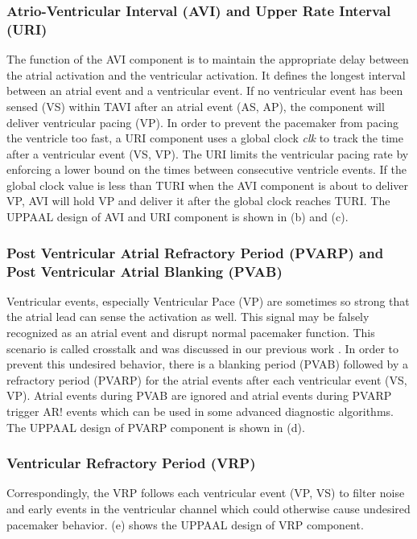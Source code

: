 \subsubsection{Atrio-Ventricular Interval (AVI) and Upper Rate Interval (URI)}
\vspace{-5pt}
The function of the AVI component is to maintain the appropriate delay between the atrial activation and the ventricular activation. It defines the longest interval between an atrial event and a ventricular event. If no ventricular event has been sensed \textsf{(VS)} within TAVI after an atrial event \textsf{(AS, AP)}, the component will deliver ventricular pacing \textsf{(VP)}. In order to prevent the pacemaker from pacing the ventricle too fast, a URI component uses a global clock \emph{clk} to track the time after a ventricular event \textsf{(VS, VP)}. The URI limits the ventricular pacing rate by enforcing a lower bound on the times between consecutive ventricle events. If the global clock value is less than TURI when the AVI component is about to deliver \textsf{VP}, AVI will hold VP and deliver it after the global clock reaches TURI. The UPPAAL design of AVI and URI component is shown in (b) and (c).%

\subsubsection{Post Ventricular Atrial Refractory Period (PVARP) and Post Ventricular Atrial Blanking (PVAB)}
\vspace{-5pt}
Ventricular events, especially Ventricular Pace (VP) are sometimes so strong that the atrial lead can sense the activation as well. This signal may be falsely recognized as an atrial event and disrupt normal pacemaker function. This scenario is called crosstalk and was discussed in our previous work \cite{vhm_embc11}. In order to prevent this undesired behavior, there is a blanking period (PVAB) followed by a refractory period (PVARP) for the atrial events after each ventricular event \textsf{(VS, VP)}. Atrial events during PVAB are ignored and atrial events during PVARP trigger \textsf{AR!} events which can be used in some advanced diagnostic algorithms. The UPPAAL design of PVARP component is shown in (d).

\subsubsection{Ventricular Refractory Period (VRP)}
\vspace{-5pt}
Correspondingly, the VRP follows each ventricular event \textsf{(VP, VS)} to filter noise and early events in the ventricular channel which could otherwise cause undesired pacemaker behavior. (e) shows the UPPAAL design of VRP component.


